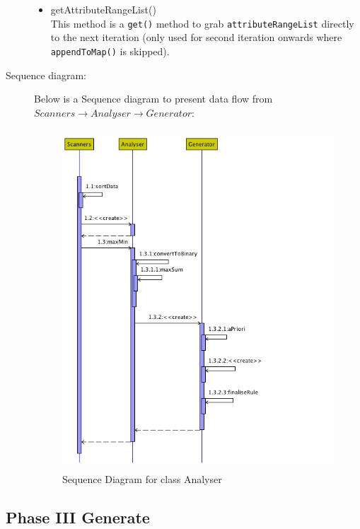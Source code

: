 \begin{description}
\begin{itemize}
	\item{getAttributeRangeList()} \\
	This method is a \texttt{get()} method to grab \texttt{attributeRangeList} directly to the next iteration (only used for second iteration onwards where \texttt{appendToMap()} is skipped). 
	
\end{itemize}

\item[Sequence diagram: ] 
Below is a Sequence diagram to present data flow from $Scanners \rightarrow Analyser \rightarrow Generator$:

\begin{figure}[h]
    \centering
    \includegraphics[width=4.5in, height=5in]{figures/sequence_analyser}
    \caption[Sequence Diagram for class Analyser]{Sequence Diagram for class Analyser}
    \label{fig:figure4_32}
\end{figure}

\end{description}

\subsection{Phase III Generate}

